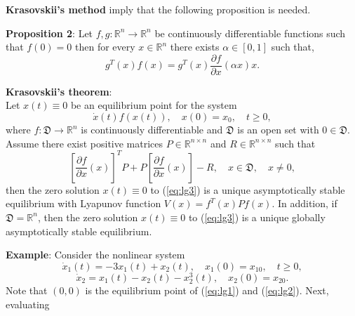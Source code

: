 \documentclass[a4paper]{report}
\theoremstyle{definition}
\begin{document}
\textbf{Krasovskii's method} imply that the following proposition is needed.
\\
\begin{mdframed}[backgroundcolor=airforceblue!25] 
\textbf{Proposition 2}: Let $f,g:\mathbb{R}^n\rightarrow\mathbb{R}^n$ be continuously differentiable functions such that $f(0)=0$ then for every $x\in\mathbb{R}^n$ there exists $\alpha\in[0,1]$ such that,
\\
\begin{equation}
g^T(x)f(x)=g^T(x)\frac{\partial f}{\partial x}(\alpha x)x.
\end{equation}
\end{mdframed}
\begin{mdframed}[backgroundcolor=airforceblue!25] 
\textbf{Krasovskii's theorem}:
\\
Let $x(t)\equiv0$ be an equilibrium point for the  system 
\begin{equation}
\dot{x}(t)f(x(t)), \quad x(0)=x_0, \quad t\ge 0,
\label{eq:lg3}
\end{equation}
where $f:\mathfrak{D}\rightarrow \mathbb{R}^n$ is continuously differentiable and $\mathfrak{D}$ is an open set with $0\in \mathfrak{D}$. Assume there exist positive matrices $P\in \mathbb{R}^{n\times n}$ and $R\in \mathbb{R}^{n\times n}$ such that
\\
\begin{equation}
\left[\frac{\partial f}{\partial x}(x)\right]^T P+P\left[\frac{\partial f}{\partial x}(x)\right]-R, \quad x\in \mathfrak{D}, \quad x\not= 0,
\end{equation}
then the zero solution $x(t)\equiv 0$ to (\ref{eq:lg3}) is a unique asymptotically stable equilibrium with Lyapunov function $V(x)=f^T(x)Pf(x)$. In addition, if $\mathfrak{D}=\mathbb{R}^n$, then the zero solution $x(t)\equiv 0$ to (\ref{eq:lg3}) is a unique globally asymptotically stable equilibrium.
\end{mdframed}

\textbf{Example}: Consider the nonlinear system
\begin{equation}
\dot{x}_1(t)=-3x_1(t)+x_2(t), \quad x_1(0)=x_{10}, \quad t\ge0,
\label{eq:lg1}
\end{equation}
\begin{equation}
\dot{x}_2=x_1(t)-x_2(t)-x_2^3(t), \quad x_2(0)=x_{20}. 
\label{eq:lg2}
\end{equation}
Note that $(0,0)$ is the equilibrium point of (\ref{eq:lg1}) and (\ref{eq:lg2}). Next, evaluating
\end{document}
